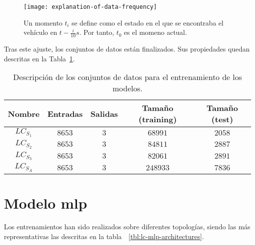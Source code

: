 \begin{figure}
	\centering
	\texttt{[image: explanation-of-data-frequency]}
	\caption[Momento $t_i$en el conjunto de datos]{Un momento $t_i$ se define como el estado en el que se encontraba el vehículo en $t - \frac{i}{10}s$. Por tanto, $t_0$ es el momeno actual.}
	\label{fig:moments-illustration}
\end{figure}

Tras este ajuste, los conjuntos de datos están finalizados. Sus propiedades quedan descritas en la Tabla~\ref{tbl:lc-datasets-description}.

\begin{table}
	\caption[Descripción de los conjuntos de datos]{Descripción de los conjuntos de datos para el entrenamiento de los modelos.}
	\label{tbl:lc-datasets-description}
	\begin{tabular}{ccccc}
		\toprule
		Nombre & Entradas & Salidas & Tamaño (training) & Tamaño (test) \\
		\midrule
		$LC_{S_1}$ & $8653$ & $3$ & $68991$ & $2058$ \\
		$LC_{S_2}$ & $8653$ & $3$ & $84811$ & $2887$ \\
		$LC_{S_3}$ & $8653$ & $3$ & $82061$ & $2891$ \\
		$LC_{S_A}$ & $8653$ & $3$ & $248933$ & $7836$ \\
		\bottomrule
	\end{tabular}
\end{table}

\section{Modelo \ac{mlp}}

Los entrenamientos han sido realizados sobre diferentes topologías, siendo las más representativas las descritas en la tabla~~\ref{tbl:lc-mlp-architectures}.

